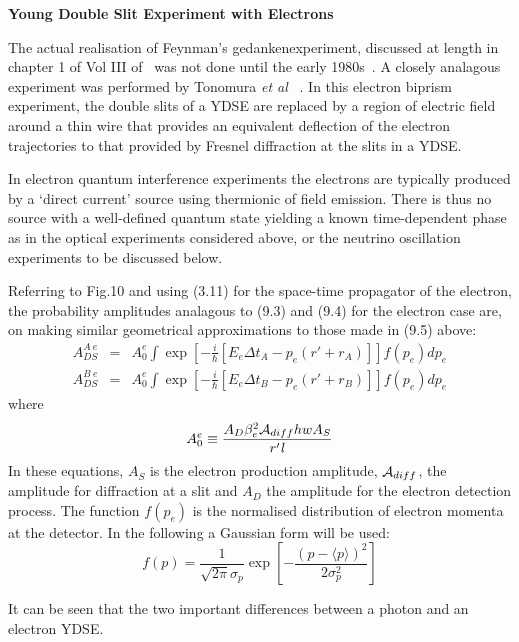 \documentclass [12pt]{article}
\begin{document}
{     \par {\bf \Large Young Double Slit Experiment with Electrons}
      \par The actual realisation of Feynman's gedankenexperiment, discussed at length in chapter 1 of Vol III
    of~\cite{Feyn2} was not done until the early 1980s~\cite{TIKH}. A closely analagous experiment was
    performed by Tonomura {\it et al} ~\cite{TEMK}.
    In this electron biprism experiment, the double slits of a YDSE are replaced by a region of electric 
     field around a thin wire that provides an equivalent deflection of the electron trajectories to that
     provided by Fresnel diffraction at the slits in a YDSE. 
    \par In electron quantum interference experiments the electrons are typically 
    produced by a `direct current' source using thermionic of field emission.
    There is thus no source with a well-defined quantum state yielding a known time-dependent
   phase as in the optical experiments considered above, or the neutrino oscillation experiments to 
   be discussed below. 
   \par Referring to Fig.10 and using (3.11) for the space-time propagator of the electron,
   the probability amplitudes analagous to (9.3) and (9.4) for the electron case are, on making similar
    geometrical approximations to those made in (9.5) above:
  \begin{eqnarray}
    A_{DS}^{A~e} & = &  A_0^e
   \int \exp\left[-\frac{i}{\hbar}[E_e \Delta t_A-p_e(r'+r_A)]\right] f(p_e)d p_e \\
   A_{DS}^{B ~e} & = &  A_0^e
   \int \exp\left[-\frac{i}{\hbar}[E_e \Delta t_B-p_e(r'+r_B)]\right] f(p_e)d p_e
  \end{eqnarray}
   where 
    \begin{equation}
      A_0^e \equiv  \frac{A_D \beta_e^2  {\cal A}_{diff} h w A_S}{r' {\it l}}
    \end{equation}  
   In these equations, $A_S$ is the electron production amplitude, ${\cal A}_{diff}$, the amplitude for
    diffraction at a slit and $A_D$ the amplitude for the electron detection process. The function
    $f(p_e)$ is the normalised distribution of electron momenta at the detector. In the following
   a Gaussian form will be used:
    \begin{equation}
     f(p) = \frac{1}{\sqrt{2 \pi}\sigma_p}\exp\left[-\frac{(p-\langle p \rangle)^2}{2 \sigma_p^2}\right]
   \end{equation} 
    \par It can be seen that the two important differences between a photon and  an electron YDSE.
}
\end{document}
